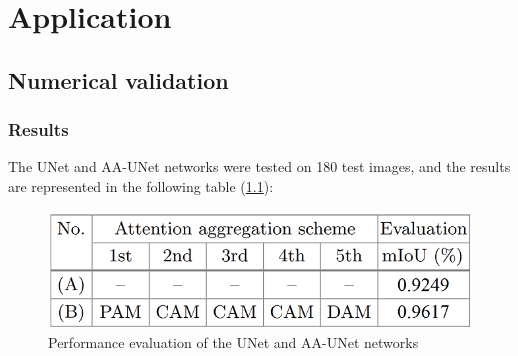 \documentclass[runningheads,a4paper,11pt]{report}
\begin{document}
\newpage
\chapter{Application}
\label{chapter:application}

\section{Numerical validation}
\label{section:numericalValidation}

\subsection{Results}
\label{section:results}

The UNet and AA-UNet networks were tested on 180 test images, and the results are represented in the following table (\ref{uNetEval}):

\begin{figure}[htbp]
    \centerline{\includegraphics{assets/uNetEval.png}}  
    \caption{Performance evaluation of the UNet and AA-UNet networks}
    \label{uNetEval}
\end{figure}




\end{document}
